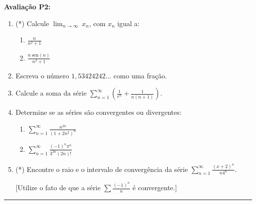 \documentclass{article}
\newcommand{\ds}{\displaystyle}
\newcommand{\sen}{\mbox{sen}}
\begin{document}
{\bf Avalia\c{c}\~ao P2:}
\begin{enumerate}
\item (*) Calcule $\displaystyle\lim_{n\rightarrow\infty}\ x_n$, com $x_n$ igual a:
	\begin{enumerate}
		\item $\ds\frac{n}{n^2+1}$
		\item $\ds\frac{n\ \sen(n)}{n^2+1}$
	\end{enumerate}

\item Escreva o n\'umero $1,53424242\ldots$ como uma fra\c{c}\~ao.

\item Calcule a soma da s\'erie $\ds\sum_{n=1}^\infty \left(\frac{1}{e^n} + \frac{1}{n(n+1)} \right)$.

\item Determine se as s\'eries s\~ao convergentes ou divergentes:
	\begin{enumerate}
		\item $\ds\sum_{n=1}^\infty \frac{n^{2n}}{(1+2n^2)^n}$
		\item $\ds\sum_{n=1}^\infty \frac{(-1)^n\pi^n}{3^{2n}(2n)!}$
	\end{enumerate}

\item (*) Encontre o raio e o intervalo de converg\^encia da s\'erie
$\ds\sum_{n=1}^\infty \frac{(x+2)^n}{n4^n}$.

[Utilize o fato de que a s\'erie $\sum\frac{(-1)^n}{n}$ \'e convergente.]

\end{enumerate}
\noindent{}\rule{\textwidth}{0.4pt}
\end{document}
